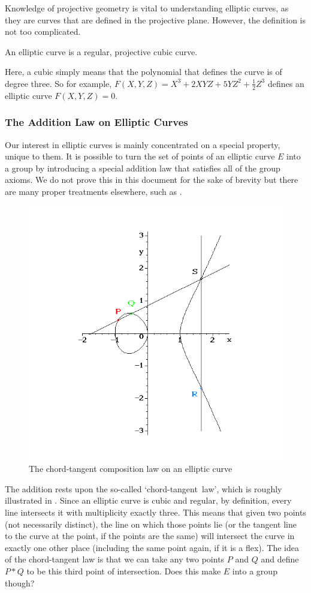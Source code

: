 Knowledge of projective geometry is vital to understanding elliptic curves, as they are curves that are defined in the projective plane.
However, the definition is not too complicated.
\begin{definition}
	An elliptic curve is a regular, projective cubic curve.
\end{definition}
Here, a cubic simply means that the polynomial that defines the curve is of degree three.
So for example, $F(X,Y,Z) = X^3 + 2XYZ + 5YZ^2 + \frac{1}{2}Z^3$ defines an elliptic curve $F(X,Y,Z) = 0$. %
\subsubsection{The Addition Law on Elliptic Curves}
Our interest in elliptic curves is mainly concentrated on a special property, unique to them.
It is possible to turn the set of points of an elliptic curve $E$ into a group by introducing a special addition law that satisfies all of the group axioms.
We do not prove this in this document for the sake of brevity but there are many proper treatments elsewhere, such as \cite{silverman2009}.
\begin{figure}[htpb]
	\centering
	\includegraphics[scale=0.5]{addition.png}
	\caption{The chord-tangent composition law on an elliptic curve}
	\label{chord-tangent}
\end{figure}
The addition rests upon the so-called `chord-tangent~law', which is roughly illustrated in .
Since an elliptic curve is cubic and regular, by definition, every line intersects it with multiplicity exactly three.
This means that given two points (not necessarily distinct), the line on which those points lie (or the tangent line to the curve at the point, if the points are the same) will intersect the curve in exactly one other place (including the same point again, if it is a flex).
The idea of the chord-tangent law is that we can take any two points $P$ and $Q$ and define $P * Q$ to be this third point of intersection.
Does this make $E$ into a group though?

